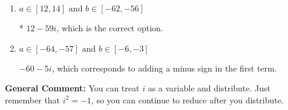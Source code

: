 \documentclass{extbook}[14pt]
\begin{document}
\begin{enumerate}
{\begin{enumerate}[label=\Alph*.]
 $-60 + 5 i$, which corresponds to adding a minus sign in the second term.
\item \( a \in [12, 14] \text{ and } b \in [-62, -56] \)

* $12 - 59 i$, which is the correct option.
\item \( a \in [-64, -57] \text{ and } b \in [-6, -3] \)

 $-60 - 5 i$, which corresponds to adding a minus sign in the first term.
\end{enumerate}

\textbf{General Comment:} You can treat $i$ as a variable and distribute. Just remember that $i^2=-1$, so you can continue to reduce after you distribute.
}
\end{enumerate}
\end{document}
